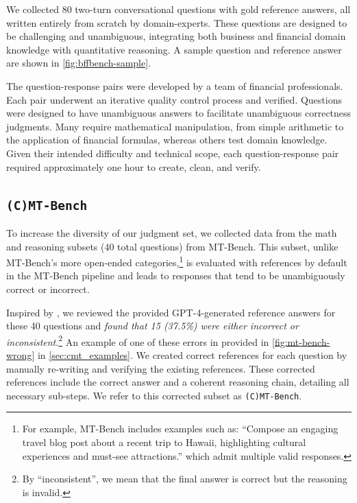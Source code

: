 \documentclass{article}
\newcommand{\cevalbenchmark}{\texttt{(C)MT-Bench}}
\begin{document}
We collected 80 two-turn conversational questions with gold reference answers, all written entirely from scratch by domain-experts. These questions are designed to be challenging and unambiguous, integrating both business and financial domain knowledge with quantitative reasoning. A sample question and reference answer are shown in \cref{fig:bffbench-sample}.

The question-response pairs were developed by a team of financial professionals. Each pair underwent an iterative quality control process and verified.
Questions were designed to have unambiguous answers to facilitate unambiguous correctness judgments.
Many require mathematical manipulation, from simple arithmetic to the application of financial formulas, whereas others test domain knowledge. Given their intended difficulty and technical scope, each question-response pair required approximately one hour to create, clean, and verify.

\subsection{\cevalbenchmark{}}


To increase the diversity of our judgment set, we collected data from the math and reasoning subsets (40 total questions) from MT-Bench. This subset, unlike MT-Bench's more open-ended categories,\footnote{For example, MT-Bench includes examples such as: ``Compose an engaging travel blog post about a recent trip to Hawaii, highlighting cultural experiences and must-see attractions.'' which admit multiple valid responses.} is evaluated with references by default in the MT-Bench pipeline and leads to responses that tend to be unambiguously correct or incorrect.

Inspired by \citet{inflectionai}, we reviewed the provided GPT-4-generated reference answers for these 40 questions and \emph{found that 15 (37.5\%) were either incorrect or inconsistent}.\footnote{By ``inconsistent'', we mean that the final answer is correct but the reasoning is invalid.} An example of one of these errors in provided in \cref{fig:mt-bench-wrong} in \cref{sec:cmt_examples}. We created correct references for each question by manually re-writing and verifying the existing references. These corrected references include the correct answer and a coherent reasoning chain, detailing all necessary sub-steps. We refer to this corrected subset as \cevalbenchmark{}. %
\end{document}
